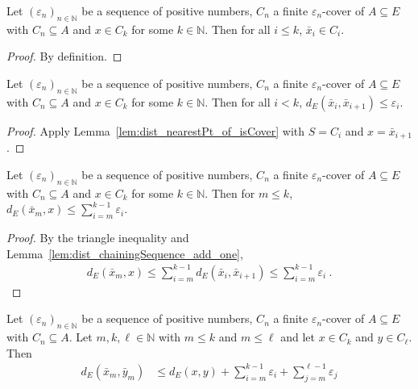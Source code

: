 \begin{lemma}\label{lem:chainingSequence_mem}
  \leanok
Let $(\varepsilon_n)_{n \in \mathbb{N}}$ be a sequence of positive numbers, $C_n$ a finite $\varepsilon_n$-cover of $A \subseteq E$ with $C_n \subseteq A$ and $x \in C_k$ for some $k \in \mathbb{N}$.
Then for all $i \le k$, $\bar{x}_i\in C_i$.
\end{lemma}

\begin{proof}\leanok
By definition.
\end{proof}


\begin{lemma}\label{lem:dist_chainingSequence_add_one}
  \leanok
Let $(\varepsilon_n)_{n \in \mathbb{N}}$ be a sequence of positive numbers, $C_n$ a finite $\varepsilon_n$-cover of $A \subseteq E$ with $C_n \subseteq A$ and $x \in C_k$ for some $k \in \mathbb{N}$.
Then for all $i < k$, $d_E(\bar{x}_i, \bar{x}_{i+1}) \le \varepsilon_i$.
\end{lemma}

\begin{proof}\leanok
Apply Lemma~\ref{lem:dist_nearestPt_of_isCover} with $S = C_i$ and $x = \bar{x}_{i+1}$.
\end{proof}


\begin{lemma}\label{lem:dist_chainingSequence_le_sum}
  \leanok
Let $(\varepsilon_n)_{n \in \mathbb{N}}$ be a sequence of positive numbers, $C_n$ a finite $\varepsilon_n$-cover of $A \subseteq E$ with $C_n \subseteq A$ and $x \in C_k$ for some $k \in \mathbb{N}$.
Then for $m \le k$, $d_E(\bar{x}_m, x) \le \sum_{i=m}^{k-1} \varepsilon_i$.
\end{lemma}

\begin{proof}\leanok
By the triangle inequality and Lemma~\ref{lem:dist_chainingSequence_add_one},
\begin{align*}
  d_E(\bar{x}_m, x)
  \le \sum_{i=m}^{k-1} d_E(\bar{x}_i, \bar{x}_{i+1})
  \le \sum_{i=m}^{k-1} \varepsilon_i
  \: .
\end{align*}
\end{proof}


\begin{lemma}\label{lem:dist_chainingSequence_le}
  \leanok
Let $(\varepsilon_n)_{n \in \mathbb{N}}$ be a sequence of positive numbers, $C_n$ a finite $\varepsilon_n$-cover of $A \subseteq E$ with $C_n \subseteq A$.
Let $m, k, \ell \in \mathbb{N}$ with $m \le k$ and $m \le \ell$ and let $x \in C_k$ and $y \in C_\ell$.
Then
\begin{align*}
  d_E(\bar{x}_m, \bar{y}_m)
  &\le d_E(x, y) + \sum_{i=m}^{k-1} \varepsilon_i + \sum_{j=m}^{\ell-1} \varepsilon_j
\end{align*}
\end{lemma}

